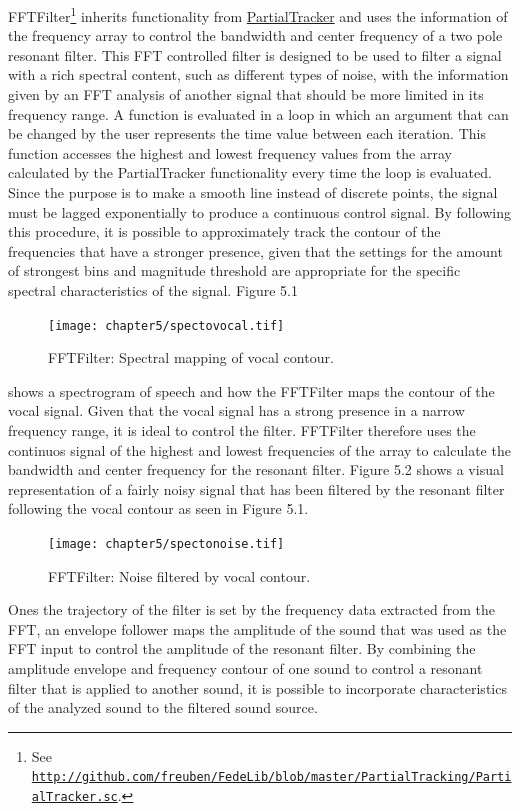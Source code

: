 FFTFilter\footnote{See \href{http://github.com/freuben/FedeLib/blob/master/PartialTracking/PartialTracker.sc}{\texttt{http://github.com/freuben/FedeLib/blob/master/PartialTracking/PartialTracker.sc}}.} inherits functionality from \hyperlink{partrack}{PartialTracker} and uses the information of the frequency array to control the bandwidth and center frequency of a two pole resonant filter. This FFT controlled filter is designed to be used to filter a signal with a rich spectral content, such as different types of noise, with the information given by an FFT analysis of another signal that should be more limited in its frequency range. A function is evaluated in a loop in which an argument that can be changed by the user represents the time value between each iteration. This function accesses the highest and lowest frequency values from the array calculated by the PartialTracker functionality every time the loop is evaluated. Since the purpose is to make a smooth line instead of discrete points, the signal must be lagged exponentially to produce a continuous control signal. By following this procedure, it is possible to approximately track the contour of the frequencies that have a stronger presence, given that the settings for the amount of strongest bins and magnitude threshold are appropriate for the specific spectral characteristics of the signal. Figure 5.1 
\begin{figure}[htbp] %
   \centering
   \texttt{[image: chapter5/spectovocal.tif]} %
   \caption{FFTFilter: Spectral mapping of vocal contour.}
   \label{fig:example}
\end{figure}
shows a spectrogram of speech and how the FFTFilter maps the contour of the vocal signal. Given that the vocal signal has a strong presence in a narrow frequency range, it is ideal to control the filter. FFTFilter therefore uses the continuos signal of the highest and lowest frequencies of the array to calculate the bandwidth and center frequency for the resonant filter. Figure 5.2 shows a visual representation of a fairly noisy signal that has been filtered by the resonant filter following the vocal contour as seen in Figure 5.1. 
\begin{figure}[htbp] %
   \centering
   \texttt{[image: chapter5/spectonoise.tif]} %
   \caption{FFTFilter: Noise filtered by vocal contour.}
   \label{fig:example}
\end{figure}
Ones the trajectory of the filter is set by the frequency data extracted from the FFT, an envelope follower maps the amplitude of the sound that was used as the FFT input to control the amplitude of the resonant filter. By combining the amplitude envelope and frequency contour of one sound to control a resonant filter that is applied to another sound, it is possible to incorporate characteristics of the analyzed sound to the filtered sound source.


